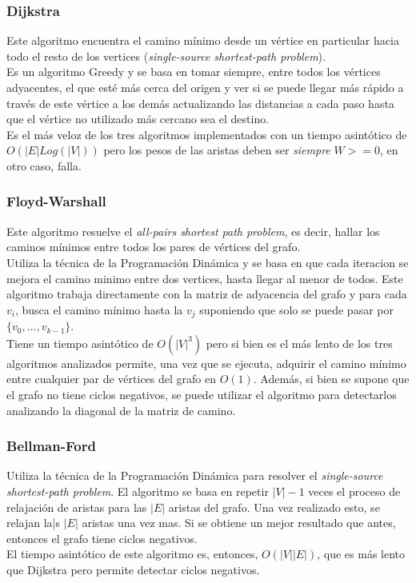 \documentclass{article}
\newcommand\tab[1][0.5cm]{\hspace*{#1}}
\begin{document}
            \subsubsection{Dijkstra}
            \tab Este algoritmo encuentra el camino mínimo desde un vértice en particular hacia todo
            el resto de los vertices (\emph{single-source shortest-path problem}). \\
            \tab Es un algoritmo Greedy y se basa en tomar siempre, entre todos los vértices adyacentes,
            el que esté más cerca del origen y ver si se puede llegar más rápido a través de este vértice a los demás
            actualizando las distancias a cada paso hasta que el vértice no utilizado más cercano sea el destino. \\
            \tab Es el más veloz de los tres algoritmos implementados con un tiempo asintótico de
            $O(|E|Log(|V|))$ pero los pesos de las aristas deben ser \emph{siempre} $W >= 0$, en otro caso, falla.

            \subsubsection{Floyd-Warshall}
            \tab Este algoritmo resuelve el \emph{all-pairs shortest path problem}, es decir, hallar los
            caminos mínimos entre todos los pares de vértices del grafo. \\
            \tab Utiliza la técnica de la Programación Dinámica y se basa en que cada iteracion se mejora
            el camino minimo entre dos vertices, hasta llegar al menor de todos. Este algoritmo trabaja
            directamente con la matriz de adyacencia del grafo y para cada $v_{i}$, busca el camino
            mínimo hasta la $v_{j}$ suponiendo que solo se puede pasar por $\{ v_{0}, ..., v_{k-1}\}$.\\
            \tab Tiene un tiempo asintótico de $O(|V|^3)$ pero si bien es el más lento de los tres
            algoritmos analizados permite, una vez que se ejecuta, adquirir el camino mínimo entre cualquier
            par de vértices del grafo en $O(1)$. Además, si bien se supone que el grafo no tiene ciclos negativos,
            se puede utilizar el algoritmo para detectarlos analizando la diagonal de la matriz de camino.

            \subsubsection{Bellman-Ford}
            \tab Utiliza la técnica de la Programación Dinámica para resolver el \emph{single-source shortest-path problem}.
            \tab El algoritmo se basa en repetir $|V| - 1$ veces el proceso de relajación de aristas para
            las $|E|$ aristas del grafo. Una vez realizado esto, se relajan la|s $|E|$ aristas una vez mas.
            Si se obtiene un mejor resultado que antes, entonces el grafo tiene ciclos negativos. \\
            \tab El tiempo asintótico de este algoritmo es, entonces, $O(|V||E|)$, que es más lento que Dijkstra
            pero permite detectar ciclos negativos.
\end{document}
